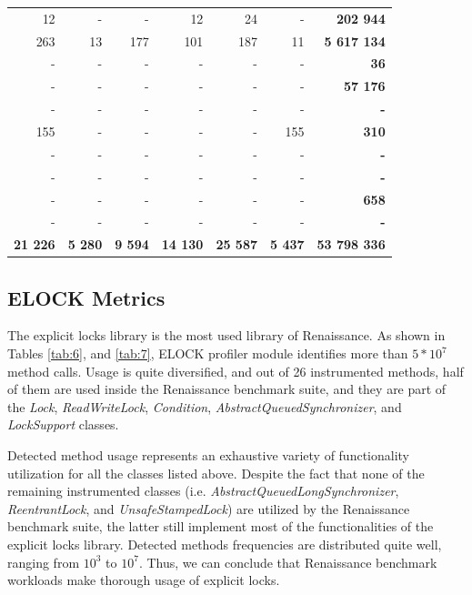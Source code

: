 \documentclass[]{usiinfthesis}
\begin{document}
\begin{table}
\begin{tabular}{|r|r|r|r|r|r|r|}
	 12 	 & 	 -   	 & 	 -   	 & 	 12 	 & 	 24 	 & 	 -   	 &\textbf{ 	 202 944 	 }\\ 
	 263 	 & 	 13 	 & 	 177 	 & 	 101 	 & 	 187 	 & 	 11 	 &\textbf{ 	 5 617 134 	 }\\ 
	 -   	 & 	 -   	 & 	 -   	 & 	 -   	 & 	 -   	 & 	 -   	 &\textbf{ 	 36 	 }\\ 
	 -   	 & 	 -   	 & 	 -   	 & 	 -   	 & 	 -   	 & 	 -   	 &\textbf{ 	 57 176 	 }\\ 
	 -   	 & 	 -   	 & 	 -   	 & 	 -   	 & 	 -   	 & 	 -   	 &\textbf{ 	 -   	 }\\ 
	 155 	 & 	 -   	 & 	 -   	 & 	 -   	 & 	 -   	 & 	 155 	 &\textbf{ 	 310 	 }\\ 
	 -   	 & 	 -   	 & 	 -   	 & 	 -   	 & 	 -   	 & 	 -   	 &\textbf{ 	 -   	 }\\ 
	 -   	 & 	 -   	 & 	 -   	 & 	 -   	 & 	 -   	 & 	 -   	 &\textbf{ 	 -   	 }\\ 
	 -   	 & 	 -   	 & 	 -   	 & 	 -   	 & 	 -   	 & 	 -   	 &\textbf{ 	 658 	 }\\ 
	 -   	 & 	 -   	 & 	 -   	 & 	 -   	 & 	 -   	 & 	 -   	 &\textbf{ 	 -   	 }\\ 
								
								\hline						
 \textbf{ 	 21 226 	 }&\textbf{ 	 5 280 	 }&\textbf{ 	 9 594 	 }&\textbf{ 	 14 130 	 }&\textbf{ 	 25 587 	 }&\textbf{ 	 5 437 	 }&\textbf{ 	 53 798 336 	 }\\\hline 
\end{tabular}
\end{table}%

\newpage


\subsection{ELOCK Metrics}
The explicit locks library is the most used library of Renaissance. As shown in Tables \ref{tab:6}, and \ref{tab:7}, ELOCK profiler module identifies more than \(5*10^7\) method calls. Usage is quite diversified, and out of 26 instrumented methods, half of them are used inside the Renaissance benchmark suite, and they are part of the \textit{Lock}, \textit{ReadWriteLock}, \textit{Condition}, \textit{AbstractQueuedSynchronizer}, and \textit{LockSupport} classes.

 Detected method usage represents an exhaustive variety of functionality utilization for all the classes listed above. Despite the fact that none of the remaining instrumented classes (i.e. \textit{AbstractQueuedLongSynchronizer}, \textit{ReentrantLock}, and \textit{UnsafeStampedLock}) are utilized by the Renaissance benchmark suite, the latter still implement most of the functionalities of the explicit locks library. Detected methods frequencies are distributed quite well, ranging from \(10^3\) to \(10^7\). Thus, we can conclude that Renaissance benchmark workloads make thorough usage of explicit locks.
 
\end{document}
